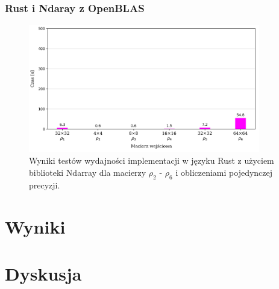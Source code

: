 \documentclass[11pt, a4paper]{article}
\begin{document}
\begin{sloppypar}
    \subsubsection{ Rust i Ndaray z OpenBLAS }

    \FloatBarrier
    \begin{figure}[ht]
      \centering
      \includegraphics[width=0.9\textwidth]{"resources/rust_blas_single_tests.png"}
      \caption{Wyniki testów wydajności implementacji w języku Rust z użyciem biblioteki Ndarray dla macierzy $\rho
      _{2}$ - $\rho_{6}$ i obliczeniami pojedynczej precyzji.}
      \label{sp-rust-blas-perf}
    \end{figure}
    \FloatBarrier

    \section{Wyniki}


    \section{Dyskusja}
  \end{sloppypar}
  \newpage
  \begin{sloppypar}
    \medskip


    \printbibliography
    [heading=bibintoc, title={Odwołania}]
  \end{sloppypar}
\end{document}

